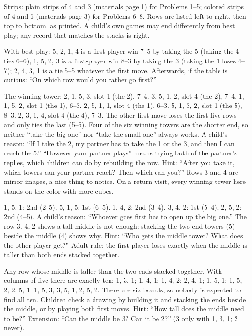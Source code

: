 Strips: plain strips of 4 and 3 (materials page 1) for Problems 1--5; colored strips of 4 and 6 (materials page 3) for Problems 6--8. Rows are listed left to right, then top to bottom, as printed. A child's own games may end differently from best play; any record that matches the stacks is right.

 With best play: 5, 2, 1, 4 is a first-player win 7--5 by taking the 5 (taking the 4 ties 6--6); 1, 5, 2, 3 is a first-player win 8--3 by taking the 3 (taking the 1 loses 4--7); 2, 4, 3, 1 is a tie 5--5 whatever the first move. Afterwards, if the table is curious: ``On which row would you rather go first?''

 The winning tower: 2, 1, 5, 3, slot 1 (the 2), 7--4. 3, 5, 1, 2, slot 4 (the 2), 7--4. 1, 1, 5, 2, slot 1 (the 1), 6--3. 2, 5, 1, 1, slot 4 (the 1), 6--3. 5, 1, 3, 2, slot 1 (the 5), 8--3. 2, 3, 1, 4, slot 4 (the 4), 7--3. The other first move loses the first five rows and only ties the last (5--5). Four of the six winning towers are the shorter end, so neither ``take the big one'' nor ``take the small one'' always works. A child's reason: ``If I take the 2, my partner has to take the 1 or the 3, and then I can reach the 5.'' ``However your partner plays'' means trying both of the partner's replies, which children can do by rebuilding the row. Hint: ``After you take it, which towers can your partner reach? Then which can you?'' Rows 3 and 4 are mirror images, a nice thing to notice. On a return visit, every winning tower here stands on the color with more cubes.

 1, 5, 1: 2nd (2--5). 5, 1, 5: 1st (6--5). 1, 4, 2: 2nd (3--4). 3, 4, 2: 1st (5--4). 2, 5, 2: 2nd (4--5). A child's reason: ``Whoever goes first has to open up the big one.'' The row 3, 4, 2 shows a tall middle is not enough; stacking the two end towers (5) beside the middle (4) shows why. Hint: ``Who gets the middle tower? What does the other player get?'' Adult rule: the first player loses exactly when the middle is taller than both ends stacked together.

 Any row whose middle is taller than the two ends stacked together. With columns of five there are exactly ten: 1, 3, 1; 1, 4, 1; 1, 4, 2; 2, 4, 1; 1, 5, 1; 1, 5, 2; 2, 5, 1; 1, 5, 3; 3, 5, 1; 2, 5, 2. There are six boards, so nobody is expected to find all ten. Children check a drawing by building it and stacking the ends beside the middle, or by playing both first moves. Hint: ``How tall does the middle need to be?'' Extension: ``Can the middle be 3? Can it be 2?'' (3 only with 1, 3, 1; 2 never).

